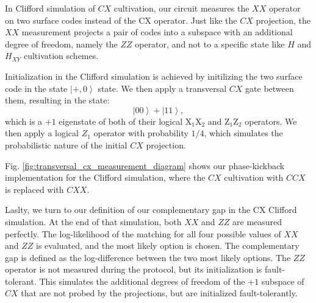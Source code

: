 \documentclass[twocolumn,notitlepage,nofootinbib,floatfix,superscriptaddress]{revtex4-1}
\begin{document}
In Clifford simulation of $CX$ cultivation, our circuit measures the $XX$ operator on two surface codes instead of the CX operator. Just like the $CX$ projection, the $XX$ measurement projects a pair of codes into a subspace with an additional degree of freedom, namely the $ZZ$ operator, and not to a specific state like $H$ and $H_{XY}$ cultivation schemes. 

 Initialization in the Clifford simulation is achieved by initilizing the two surface code in the state $\left|+,0\right>$ state. We then apply a transversal $CX$ gate between them, resulting in the state:
 $$
 \left|00\right>+\left|11\right>,
 $$
 which is a $+1$ eigenstate of both of their logical $\text{X}_1\text{X}_2$ and $\text{Z}_1\text{Z}_2$ operators. We then apply a logical $Z_1$ operator with probability $1/4$, which simulates the probabilistic nature of the initial $CX$ projection. 

Fig.  \ref{fig:transversal_cx_measurement_diagram} shows our phase-kickback implementation for the Clifford simulation, where the $CX$ cultivation with $CCX$ is replaced with $CXX$.

Laslty, we turn to our definition of our complementary gap in the CX Clifford simulation. At the end of that simulation, both $XX$ and $ZZ$ are  measured perfectly. The log-likelihood of the matching for all four possible values of $XX$ and $ZZ$ is evaluated, and the most likely option is chosen. The complementary gap is defined as the log-difference between the two most likely options.  The $ZZ$ operator is not measured during the protocol, but its initialization
is fault-tolerant. This simulates the additional degrees of
freedom of the $+1$ subspace of $CX$ that are not probed by the projections, but are initialized fault-tolerantly.
\end{document}
